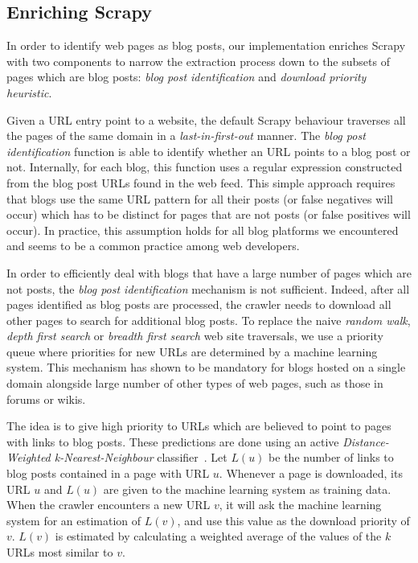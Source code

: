 \subsection{Enriching Scrapy}\label{enrichingscrapy}

In order to identify web pages as blog posts, our implementation enriches Scrapy with two components to narrow the extraction process down to the subsets of pages which are blog posts: \emph{blog post identification} and \emph{download priority heuristic}.

Given a URL entry point to a website, the default Scrapy behaviour traverses all the pages of the same domain in a \emph{last-in-first-out} manner. The \emph{blog post identification} function is able to identify whether an URL points to a blog post or not. Internally, for each blog, this function uses a regular expression constructed from the blog post URLs found in the web feed. This simple approach requires that blogs use the same URL pattern for all their posts (or false negatives will occur) which has to be distinct for pages that are not posts (or false positives will occur). In practice, this assumption holds for all blog platforms we encountered and seems to be a common practice among web developers.

In order to efficiently deal with blogs that have a large number of pages which are not posts, the \emph{blog post identification} mechanism is not sufficient. Indeed, after all pages identified as blog posts are processed, the crawler needs to download all other pages to search for additional blog posts. To replace the naive \emph{random walk}, \emph{depth first search} or \emph{breadth first search} web site traversals, we use a priority queue where priorities for new URLs are determined by a machine learning system. This mechanism has shown to be mandatory for blogs hosted on a single domain alongside large number of other types of web pages, such as those in forums or wikis.

The idea is to give high priority to URLs which are believed to point to pages with links to blog posts. These predictions are done using an active \emph{Distance-Weighted k-Nearest-Neighbour} classifier~\cite{dudani1976}. Let $L(u)$ be the number of links to blog posts contained in a page with URL $u$. Whenever a page is downloaded, its URL $u$ and $L(u)$ are given to the machine learning system as training data. When the crawler encounters a new URL $v$, it will ask the machine learning system for an estimation of $L(v)$, and use this value as the download priority of $v$. $L(v)$ is estimated by calculating a weighted average of the values of the $k$ URLs most similar to $v$.


